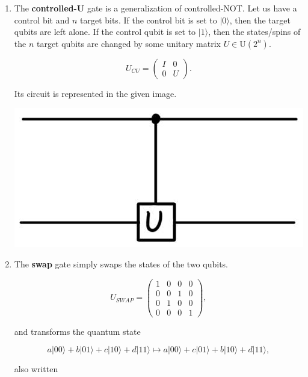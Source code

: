\documentclass{article}
\theoremstyle{definition}
\begin{document}
\begin{enumerate}
        \item The \textbf{controlled-U} gate is a generalization of controlled-NOT. Let us have a control bit and $n$ target bits. If the control bit is set to $|0 \rangle$, then the target qubits are left alone. If the control qubit is set to $|1\rangle$, then the states/spins of the $n$ target qubits are changed by some unitary matrix $U \in \text{U}(2^n)$.

          \[U_{CU} = \begin{pmatrix} I & 0 \\ 0 & U \end{pmatrix}.\]

        Its circuit is represented in the given image.

        \begin{center}
          \includegraphics[scale=0.3]{img/Control_U_gate.jpg}
        \end{center}

        \item The \textbf{swap} gate simply swaps the states of the two qubits.

            \[U_{SWAP} = \begin{pmatrix} 1&0&0&0\\0&0&1&0\\0&1&0&0\\0&0&0&1 \end{pmatrix},\]

          and transforms the quantum state

            \[a |00\rangle + b |01\rangle + c|10\rangle + d|11\rangle \mapsto a |00\rangle + c |01\rangle + b|10\rangle + d|11\rangle,\]

          also written


\end{enumerate}
\end{document}
